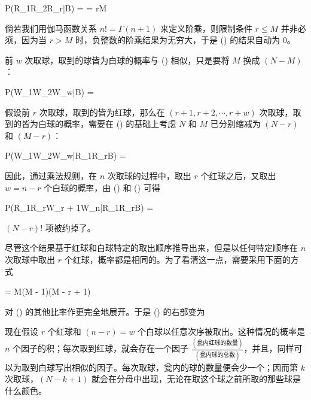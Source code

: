 \placeformula[3-12]
\startformula
\startmathalignment[style=\displaystyle]
\NC P(R_1R_2\cdots R_r|B) \NC = \NR
\NC \NC = \quad\quad r\le M\NR
\stopmathalignment
\stopformula

倘若我们用伽马函数关系 $n! = \Gamma(n + 1)$ 来定义阶乘，则限制条件 $r\le M$ 并非必须，因为当 $r > M$ 时，负整数的阶乘结果为无穷大，于是 (\in[3-12]) 的结果自动为 0。

前 $w$ 次取球，取到的球皆为白球的概率与 (\in[3-12]) 相似，只是要将 $M$ 换成 $(N - M)$：

\placeformula[3-13]
\startformula
P(W_1W_2\cdots W_w|B) = 
\stopformula

假设前 $r$ 次取球，取到的皆为红球，那么在 $(r + 1, r + 2, \cdots,r + w)$ 次取球，取到的皆为白球的概率，需要在 (\in[3-13]) 的基础上考虑 $N$ 和 $M$ 已分别缩减为 $(N - r)$ 和 $(M - r)$：

\placeformula[3-14]
\startformula
P(W_1W_2\cdots W_w|R_1\cdots R_rB) = 
\stopformula

因此，通过乘法规则，在 $n$ 次取球的过程中，取出 $r$ 个红球之后，又取出 $w = n - r$ 个白球的概率，由 (\in[3-12]) 和 (\in[3-14]) 可得

\placeformula[3-15]
\startformula
P(R_1\cdots R_rW_{r + 1}\cdots W_n|R_1\cdots R_rB) = 
\stopformula

$(N - r)!$ 项被约掉了。

尽管这个结果基于红球和白球特定的取出顺序推导出来，但是以任何特定顺序在 $n$ 次取球中取出 $r$ 个红球，概率都是相同的。为了看清这一点，需要采用下面的方式

\placeformula[3-16]
\startformula
{} = M(M - 1)\cdots (M - r + 1)
\stopformula

对 (\in[3-15]) 的其他比率作更完全地展开。于是 (\in[3-15]) 的右部变为

\placeformula[3-17]
\startformula
{}
\stopformula

现在假设 $r$ 个红球和 $(n - r) = w$ 个白球以任意次序被取出。这种情况的概率是 $n$ 个因子的积；每次取到红球，就会存在一个因子 $\frac{(\text{瓮内红球的数量})}{(\text{瓮内球的总数})}$，并且，同样可以为取到白球写出相似的因子。每次取球，瓮内的球的数量便会少一个；因而第 $k$ 次取球，$(N - k + 1)$ 就会在分母中出现，无论在取这个球之前所取的那些球是什么颜色。

